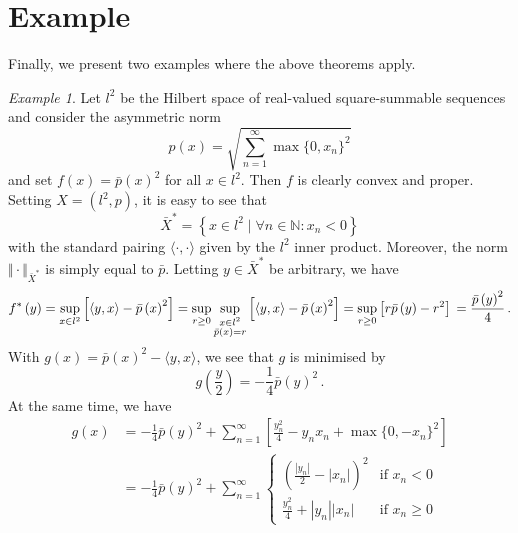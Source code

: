 \documentclass[
	paper=A4,
	pagesize=auto,
	fontsize=12pt
]{scrartcl}
\theoremstyle{plain}
\theoremstyle{remark}
\newtheorem{example}[theorem]{Example}
\theoremstyle{definition}
\begin{document}
\section{Example}
%
Finally, we present two examples where the above theorems apply.
%
\begin{example}
Let $l^2$ be the Hilbert space of real-valued square-summable sequences and consider the asymmetric norm
%
\begin{equation}
p \left( x \right)
=
\sqrt{
\sum_{n = 1}^{\infty}
\max \{ 0, x_n \}^2
}
\end{equation}
%
and set $f(x) = \bar{p}(x)^2$ for all $x \in l^2$.
Then $f$ is clearly convex and proper.
Setting $X = (l^2, p)$, it is easy to see that
%
\begin{equation}
\bar{X}^*
=
\left\{
x \in l^2 \mid
\forall n \in \mathbb{N} :
x_n < 0
\right\}
\end{equation}
%
with the standard pairing $\langle\cdot,\cdot\rangle$ given by the $l^2$ inner product.
Moreover, the norm $\Vert \cdot \Vert_{\bar{X}^*}$ is simply equal to $\bar{p}$.
Letting $y \in \bar{X}^*$ be arbitrary, we have
%
\begin{equation}
f^* \left( y \right)
=
\sup_{x \in l^2}
\left[ \left\langle y, x \right\rangle - \bar{p} \left( x \right)^2 \right]
=
\sup_{r \ge 0}
\sup_{\substack{x \in l^2\\\bar{p}(x) = r}}
\left[ \left\langle y, x \right\rangle - \bar{p} \left( x \right)^2 \right]
=
\sup_{r \ge 0}
\left[ r \bar{p} \left( y \right) - r^2 \right] \\
=
\frac{\bar{p} \left( y \right)^2}{4} \, .
\end{equation}
%
With $g(x) = \bar{p}(x)^2 - \langle y, x \rangle$, we see that $g$ is minimised by
%
\begin{equation}
g \left( \frac{y}{2} \right)
=
- \frac{1}{4} \bar{p} \left( y \right)^2 \, .
\end{equation}
%
At the same time, we have
%
\begin{equation}
\begin{aligned}
g \left( x \right)
&=
- \frac{1}{4} \bar{p} \left( y \right)^2
+ \sum_{n = 1}^\infty \left[
\frac{ y_n^2 }{4}
- y_n x_n
+ \max \{ 0, -x_n \}^2
\right] \\
&=
- \frac{1}{4} \bar{p} \left( y \right)^2
+ \sum_{n = 1}^\infty
\begin{cases}
\left( \frac{\left| y_n \right|}{2} - \left| x_n \right| \right)^2 & \text{if } x_n < 0 \\
\frac{ y_n^2 }{4}
+ \left| y_n \right| \left| x_n \right| & \text{if } x_n \ge 0

\end{cases}
\end{aligned}
\end{equation}
\end{example}
\end{document}
